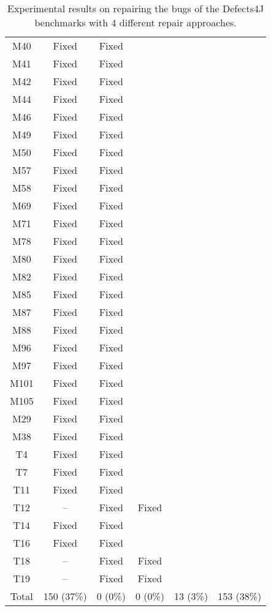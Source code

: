 \begin{table}[!t]
{\begin{tabular}{|c|c|c|c|c|c|}
M40               & Fixed     &Fixed   \\
M41               & Fixed     &Fixed   \\
M42               & Fixed     &Fixed   \\
M44               & Fixed     &Fixed   \\
M46               & Fixed     &Fixed   \\
M49               & Fixed     &Fixed   \\
M50               & Fixed     &Fixed   \\
M57               & Fixed     &Fixed   \\
M58               & Fixed     &Fixed   \\
M69               & Fixed     &Fixed   \\
M71               & Fixed     &Fixed   \\
M78               & Fixed     &Fixed   \\
M80               & Fixed     &Fixed   \\
M82               & Fixed     &Fixed   \\
M85               & Fixed     &Fixed   \\
M87               & Fixed     &Fixed   \\
M88               & Fixed     &Fixed   \\
M96               & Fixed     &Fixed   \\
M97               & Fixed     &Fixed   \\
M101              & Fixed     &Fixed   \\
M105              & Fixed     &Fixed   \\
\hline
M29               & Fixed     &Fixed   \\
M38               & Fixed     &Fixed   \\
\hline
T4                & Fixed     &Fixed   \\
T7                & Fixed     &Fixed   \\
T11               & Fixed     &Fixed   \\
T12               & --        & Fixed     &Fixed   \\
T14               & Fixed     &Fixed   \\
T16               & Fixed     &Fixed   \\
T18               & --        & Fixed     &Fixed   \\
T19               & --        & Fixed     &Fixed   \\
\hline
Total             & 150 (37\%) & 0 (0\%)   & 0 (0\%)   & 13 (3\%)  & 153 (38\%)\\
\hline 
\end{tabular}%
}
\caption{Experimental results on repairing the bugs of the Defects4J benchmarks with 4 different repair approaches.}
\end{table}
